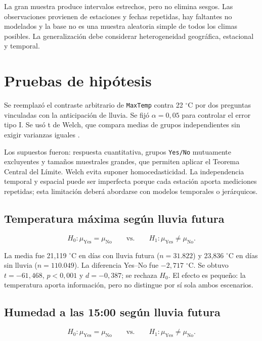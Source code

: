 \documentclass[11pt,a4paper]{article}
\begin{document}
La gran muestra produce intervalos estrechos, pero no elimina sesgos. Las observaciones provienen de estaciones y fechas repetidas, hay faltantes no modelados y la base no es una muestra aleatoria simple de todos los climas posibles. La generalización debe considerar heterogeneidad geográfica, estacional y temporal.

\section{Pruebas de hipótesis}
\label{sec:hipotesis}

Se reemplazó el contraste arbitrario de \texttt{MaxTemp} contra 22 $^\circ$C por dos preguntas vinculadas con la anticipación de lluvia. Se fijó $\alpha=0,05$ para controlar el error tipo I. Se usó t de Welch, que compara medias de grupos independientes sin exigir varianzas iguales \cite{virtanen2020}.

Los supuestos fueron: respuesta cuantitativa, grupos \texttt{Yes/No} mutuamente excluyentes y tamaños muestrales grandes, que permiten aplicar el Teorema Central del Límite. Welch evita suponer homocedasticidad. La independencia temporal y espacial puede ser imperfecta porque cada estación aporta mediciones repetidas; esta limitación deberá abordarse con modelos temporales o jerárquicos.

\subsection{Temperatura máxima según lluvia futura}

\[
H_0:\mu_{\text{Yes}}=\mu_{\text{No}}
\qquad\text{vs.}\qquad
H_1:\mu_{\text{Yes}}\neq\mu_{\text{No}}.
\]

La media fue 21,119 $^\circ$C en días con lluvia futura ($n=31.822$) y 23,836 $^\circ$C en días sin lluvia ($n=110.049$). La diferencia Yes--No fue $-2,717$ $^\circ$C. Se obtuvo $t=-61,468$, $p<0,001$ y $d=-0,387$; se rechaza $H_0$. El efecto es pequeño: la temperatura aporta información, pero no distingue por sí sola ambos escenarios.

\subsection{Humedad a las 15:00 según lluvia futura}

\[
H_0:\mu_{\text{Yes}}=\mu_{\text{No}}
\qquad\text{vs.}\qquad
H_1:\mu_{\text{Yes}}\neq\mu_{\text{No}}.
\]
\end{document}
